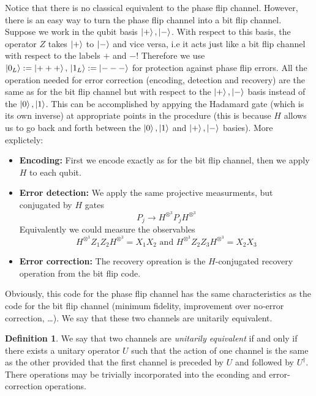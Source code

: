 \documentclass[11pt,a4paper]{article}
\theoremstyle{definition}
\newtheorem{definition}{Definition}[section]
\theoremstyle{plain}
\theoremstyle{remark}
\begin{document}
Notice that there is no classical equivalent to the phase flip channel. However, there is an easy way to turn the phase flip channel into a bit flip channel. 
Suppose we work in the qubit basis $\ket{+}, \ket{-}$. With respect to this basis, the operator $Z$ takes $\ket{+}$ to $\ket{-}$ and vice versa, i.e it acts just like a bit flip 
channel with respect to the labels $+$ and $-$! Therefore we use $\ket{0_L} := \ket{+++}, \, \ket{1_L} := \ket{---}$ for protection against phase flip errors. All the operation needed for error correction 
(encoding, detection and recovery) are the same as for the bit flip channel but with respect to the $\ket{+}, \ket{-}$ basis instead of the $\ket{0}, \ket{1}$. This can be accomplished by appying the Hadamard gate (which is its own inverse) 
at appropriate points in the procedure (this is because $H$ allows us to go back and forth between the $\ket{0}, \ket{1}$ and $\ket{+}, \ket{-}$ basies).
More explictely: 
\begin{itemize}
  \item \textbf{Encoding:} First we encode exactly as for the bit flip channel, then we apply $H$ to each qubit. 
  
  \item \textbf{Error detection:} We apply the same projective measurments, but conjugated by $H$ gates 
  $$P_j \to H^{\otimes^3} P_j H^{\otimes^3}$$
  Equivalently we could measure the observables
  $$H^{\otimes^3} Z_1 Z_2 H^{\otimes^3} = X_1 X_2 \text{ and } H^{\otimes^3} Z_2 Z_3 H^{\otimes^3} = X_2 X_3$$
  
  \item \textbf{Error correction:} The recovery opreation is the $H$-conjugated recovery operation from the bit flip code. 
\end{itemize}

Obviously, this code for the phase flip channel has the same characteristics as the code for the bit flip channel (minimum fidelity, improvement over no-error correction, \dots). We say that these two channels are unitarily equivalent. 

\begin{definition}
  We say that two channels are \emph{unitarily equivalent} if and only if there exists a unitary operator $U$ such that the action of one channel is the same as the other provided that the first channel 
  is preceded by $U$ and followed by $U^\dagger$. There operations may be trivially incorporated into the econding and error-correction operations. 
\end{definition}
\end{document}
